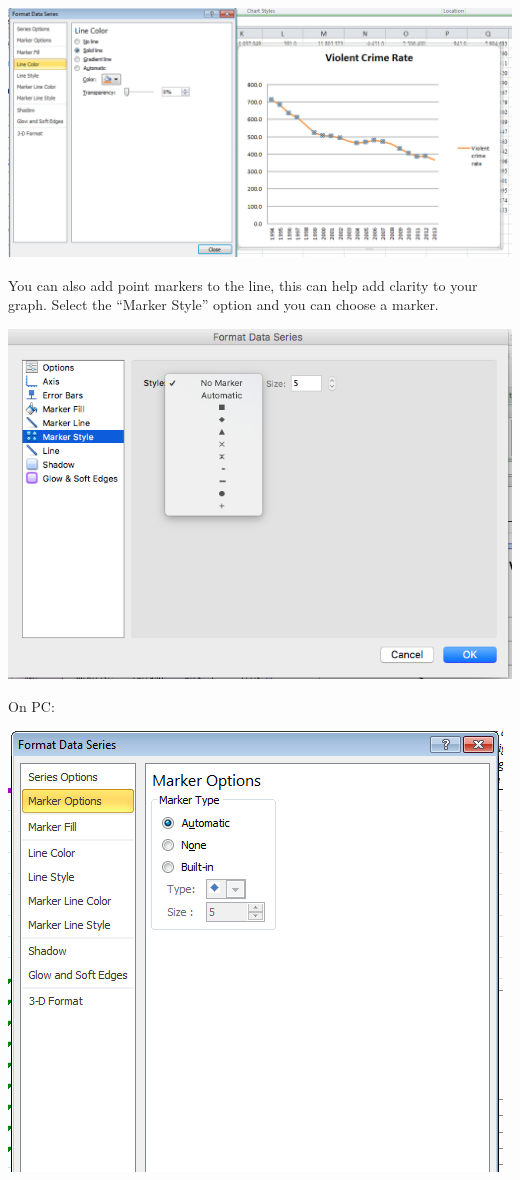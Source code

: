 \documentclass[]{book}
\theoremstyle{definition}
\theoremstyle{definition}
\theoremstyle{definition}
\theoremstyle{remark}
\begin{document}
\includegraphics{imgs/pc_edit_line.png}

You can also add point markers to the line, this can help add clarity to
your graph. Select the ``Marker Style'' option and you can choose a
marker.

\includegraphics{imgs/desc_line_markers.png}

On PC:

\includegraphics{imgs/pc_line_1.png}
\end{document}
